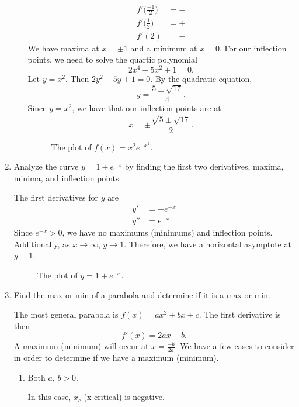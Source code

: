 \begin{enumerate}
\begin{enumerate}[label = (\alph*)]
\begin{align*}
      f'\big(\frac{-1}{2}\big) &= -\\
      f'\big(\frac{1}{2}\big) &= +\\
      f'(2) &= -
    \end{align*}
    We have maxima at \(x = \pm 1\) and a minimum at \(x = 0\).
    For our inflection points, we need to solve the quartic polynomial
    \[
    2x^4 - 5x^2 + 1 = 0.
    \]
    Let \(y = x^2\).
    Then \(2y^2 - 5y + 1 = 0\).
    By the quadratic equation,
    \[
    y = \frac{5\pm\sqrt{17}}{4}.
    \]
    Since \(y = x^2\), we have that our inflection points are at
    \[
    x = \pm\frac{\sqrt{5\pm\sqrt{17}}}{2}.
    \]
    \vspace*{-1cm}
    \begin{figure}[H]
      \centering
      
      \caption{The plot of \(f(x) = x^2e^{-x^2}\).}
    \end{figure}
  \end{enumerate}
\item
  Analyze the curve \(y = 1 + e^{-x}\) by finding the first two derivatives,
  maxima, minima, and inflection points.
  \par\smallskip
  The first derivatives for \(y\) are
  \begin{align*}
    y' &= -e^{-x}\\
    y'' &= e^{-x}
  \end{align*}
  Since \(e^{\pm x} > 0\), we have no maximums (minimums) and inflection points.
  Additionally, as \(x\to\infty\), \(y\to 1\).
  Therefore, we have a horizontal asymptote at \(y = 1\).
  \begin{figure}[H]
    \centering
    
    \caption{The plot of \(y = 1 + e^{-x}\).}
  \end{figure}
\item
  Find the max or min of a parabola and determine if it is a max or min.
  \par\smallskip
  The most general parabola is \(f(x) = ax^2 + bx + c\).
  The first derivative is then
  \[
  f'(x) = 2ax + b.
  \]
  A maximum (minimum) will occur at \(x = \frac{-b}{2a}\).
  We have a few cases to consider in order to determine if we have a maximum
  (minimum).
  \begin{enumerate}[label = {Case \arabic*:}]
  \item
    Both \(a\), \(b > 0\).
    \par\smallskip
    In this case, \(x_c\) (x critical) is negative.

\end{enumerate}
\end{enumerate}
